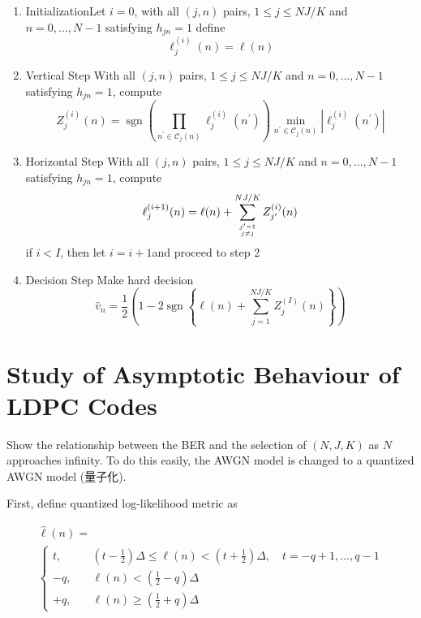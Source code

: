 \documentclass[11pt, oneside, dvipdfmx]{book}
\begin{document}
\begin{enumerate}
\item{Initialization}\newline Let $i=0$, with all $(j,n)$ pairs, $1 \leq j \leq NJ/K$ and $n=0,...,N-1$ satisfying $h_{jn}=1$ define 
\begin{equation}
\ell_{j}^{(i)}(n)=\ell(n)
\label{10}
\end{equation}

\item{Vertical Step} \newline With all $(j,n)$ pairs, $1 \leq j \leq NJ/K$ and $n=0,...,N-1$ satisfying $h_{jn}=1$, compute
\begin{equation}
Z_{j}^{(i)}(n)=\operatorname{sgn}\left(\prod_{n^{\prime} \in \mathcal{C}_{j}(n)} \ell_{j}^{(i)}\left(n^{\prime}\right)\right) \min _{n^{\prime} \in \mathcal{C}_{j}(n)}\left|\ell_{j}^{(i)}\left(n^{\prime}\right)\right|
\label{11}
\end{equation}

\item{Horizontal Step} \newline With all $(j,n)$ pairs, $1 \leq j \leq NJ/K$ and $n=0,...,N-1$ satisfying $h_{jn}=1$, compute
\begin{equation}
\ell_{j}^{(i+1)}(n)=\ell(n)+\sum_{j^{\prime}=1 \atop j \neq j}^{N J / K} Z_{j^{\prime}}^{(i)}(n)
\label{12}
\end{equation}
if $i<I$, then let $i=i+1$and proceed to step 2

\item{Decision Step} \newline Make hard decision
\begin{equation}
\hat{v}_{n}=\frac{1}{2}\left(1-2 \operatorname{sgn}\left\{\ell(n)+\sum_{j=1}^{N J / K} Z_{j}^{(I)}(n)\right\}\right)
\label{13}
\end{equation}
\end{enumerate}

 \section{Study of Asymptotic Behaviour of LDPC Codes}
Show the relationship between the BER and the selection of $(N,J,K)$ as $N$ approaches infinity. To do this easily, the AWGN model is changed to a quantized AWGN model (量子化).

First, define quantized log-likelihood metric as

\begin{equation}
\begin{array}{l}{\hat{\ell}(n)=} \\ {\left\{\begin{aligned} t, \quad &\left(t-\frac{1}{2}\right) \Delta \leq \ell(n)<\left(t+\frac{1}{2}\right) \Delta, \quad t=-q+1,...,q-1 \\-q, \quad& \ell(n)<\left(\frac{1}{2}-q\right) \Delta \\+q, \quad & \ell(n) \geq\left(\frac{1}{2}+q\right) \Delta \end{aligned}\right.}\end{array}
\end{equation}
\end{document}
